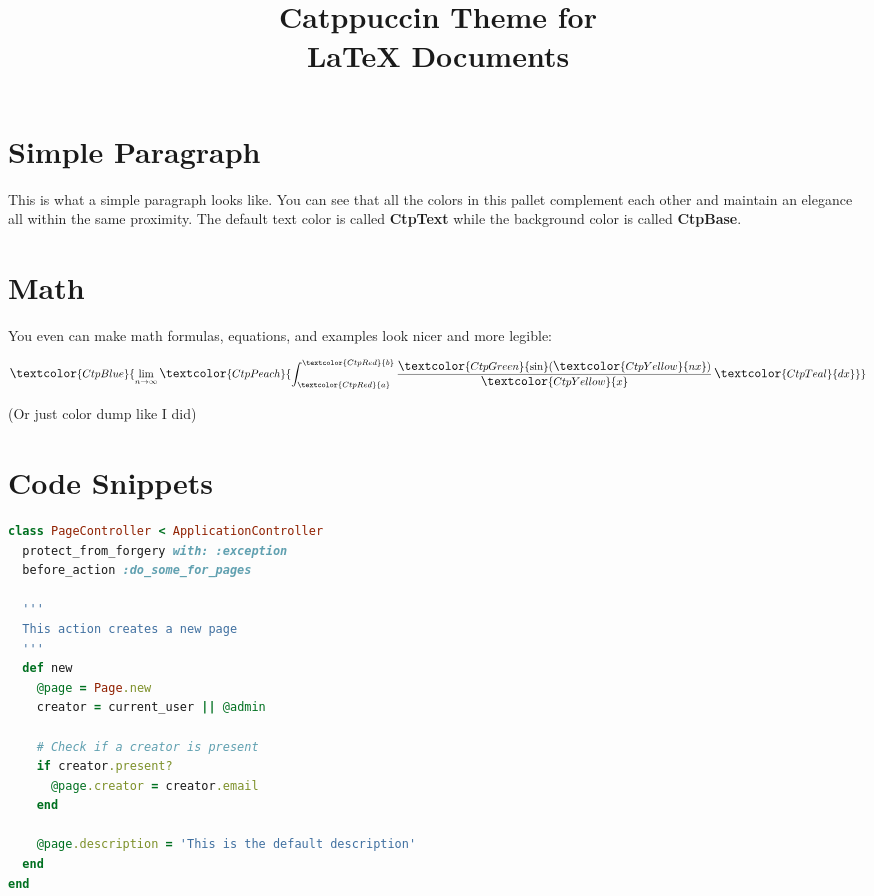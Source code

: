 \documentclass[12pt]{article}
\title{ \Huge \textbf{\textcolor{CtpPink}{Catppuccin Theme for} \\ \textcolor{CtpLavender}{\LaTeX{} Documents}} \vspace{-3em}}
\date{}
\begin{document}
\maketitle

\section{\textcolor{CtpSky}{Simple Paragraph}}
\textcolor{CtpYellow}{This is what a simple paragraph looks like.} You can see that all the colors in this pallet complement each other and maintain an elegance all within the same proximity. The default text color is called \textbf{\textcolor{CtpGreen}{CtpText}} while the background color is called \textbf{\textcolor{CtpGreen}{CtpBase}}.

\section{\textcolor{CtpSky}{Math}}

You even can make math formulas, equations, and examples look nicer and more legible:


\[\large{
    \textcolor{CtpBlue}{\lim_{{n \to \infty}} \textcolor{CtpPeach}{\int_{\textcolor{CtpRed}{a}}^{\textcolor{CtpRed}{b}} \frac{\textcolor{CtpGreen}{\sin}(\textcolor{CtpYellow}{nx})}{\textcolor{CtpYellow}{x}} \, \textcolor{CtpTeal}{dx}}}
}\]

\tiny{(Or just color dump like I did)}

\section{\textcolor{CtpSky}{Code Snippets}}

\begin{lstlisting}[language=Ruby,style=ruby_on_rails, caption={A ruby on rails code sample}]
class PageController < ApplicationController
  protect_from_forgery with: :exception
  before_action :do_some_for_pages

  '''
  This action creates a new page
  '''
  def new
    @page = Page.new
    creator = current_user || @admin

    # Check if a creator is present
    if creator.present?
      @page.creator = creator.email
    end

    @page.description = 'This is the default description'
  end
end
\end{lstlisting}
\end{document}
